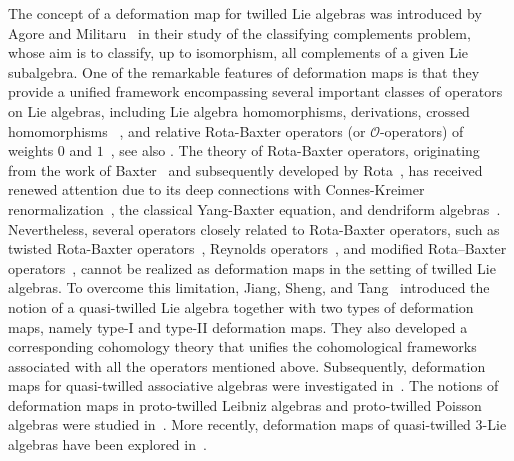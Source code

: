 \documentclass[a4paper,11pt]{article}
\numberwithin{equation}{section}
\begin{document}
The concept of a {deformation map} for twilled Lie algebras was introduced by
Agore and Militaru~\cite{AM14a,AM14b} in their study of the
{classifying complements problem}, whose aim is to classify, up to
isomorphism, all complements of a given Lie subalgebra.
One of the remarkable features of deformation maps is that they provide a
unified framework encompassing several important classes of operators on Lie
algebras, including Lie algebra homomorphisms, derivations, crossed
homomorphisms~ \cite{BBSS}, and relative Rota-Baxter operators (or
$\mathcal{O}$-operators) of weights $0$ and $1$~\cite{Ku,Uch08}, see also \cite{HB,YL,ZBC}.
The theory of Rota-Baxter operators, originating from the work of
Baxter~\cite{Bax60} and subsequently developed by Rota~\cite{Rot69}, has
received renewed attention due to its deep connections with
Connes-Kreimer renormalization~\cite{CK98,CK00}, the classical Yang-Baxter
equation, and dendriform algebras~\cite{Guo12}. Nevertheless, several operators
closely related to Rota-Baxter operators, such as twisted Rota-Baxter
operators~\cite{Das21}, Reynolds operators~\cite{Rey1895}, and modified
Rota--Baxter operators~\cite{Uch08}, cannot be realized as deformation maps in
the setting of twilled Lie algebras.
To overcome this limitation, Jiang, Sheng, and Tang~\cite{JST23} introduced the
notion of a  {quasi-twilled Lie algebra} together with two types of
deformation maps, namely  {type-I} and  {type-II deformation maps}.
They also developed a corresponding cohomology theory that unifies the
cohomological frameworks associated with all the operators mentioned above.
Subsequently, deformation maps for quasi-twilled associative algebras were
investigated in~\cite{Makhlouf}. The notions of deformation maps in
proto-twilled Leibniz algebras and proto-twilled Poisson algebras were studied
in~\cite{das one,das_two}. More recently, deformation maps of quasi-twilled
$3$-Lie algebras have been explored in~\cite{def_map_3_Lie}.
\end{document}
